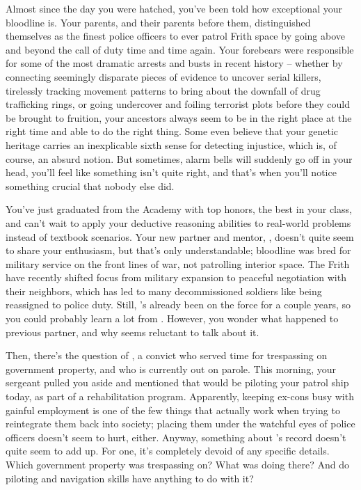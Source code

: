 \documentclass[char]{guildcamp4}
\begin{document}
\name{\cCgood{}}

Almost since the day you were hatched, you've been told how exceptional your bloodline is. Your parents, and their parents before them, distinguished themselves as the finest police officers to ever patrol Frith space by going above and beyond the call of duty time and time again. Your forebears were responsible for some of the most dramatic arrests and busts in recent history -- whether by connecting seemingly disparate pieces of evidence to uncover serial killers, tirelessly tracking movement patterns to bring about the downfall of drug trafficking rings, or going undercover and foiling terrorist plots before they could be brought to fruition, your ancestors always seem to be in the right place at the right time and able to do the right thing. Some even believe that your genetic heritage carries an inexplicable sixth sense for detecting injustice, which is, of course, an absurd notion. But sometimes, alarm bells will suddenly go off in your head, you'll feel like something isn't quite right, and that's when you'll notice something crucial that nobody else did. 

You've just graduated from the Academy with top honors, the best in your class, and can't wait to apply your deductive reasoning abilities to real-world problems instead of textbook scenarios. Your new partner and mentor, \cCbad{}, doesn't quite seem to share your enthusiasm, but that's only understandable;  bloodline was bred for military service on the front lines of war, not patrolling interior space. The Frith have recently shifted focus from military expansion to peaceful negotiation with their neighbors, which has led to many decommissioned soldiers like \cCbad{} being reassigned to police duty. Still, 's already been on the force for a couple years, so you could probably learn a lot from . However, you wonder what happened to  previous partner, and why  seems reluctant to talk about it.

Then, there's the question of \cPilot{}, a convict who served time for trespassing on government property, and who is currently out on parole. This morning, your sergeant pulled you aside and mentioned that \cPilot{} would be piloting your patrol ship today, as part of a rehabilitation program. Apparently, keeping ex-cons busy with gainful employment is one of the few things that actually work when trying to reintegrate them back into society; placing them under the watchful eyes of police officers doesn't seem to hurt, either. Anyway, something about \cPilot{}'s record doesn't quite seem to add up. For one, it's completely devoid of any specific details. Which government property was  trespassing on? What was  doing there? And do  piloting and navigation skills have anything to do with it?
\end{document}
